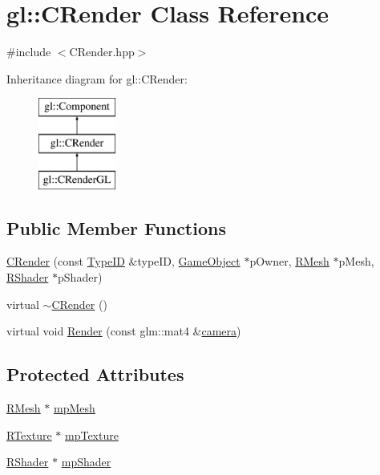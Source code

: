 \hypertarget{classgl_1_1_c_render}{\section{gl\-:\-:C\-Render Class Reference}
\label{classgl_1_1_c_render}
}


{\ttfamily \#include $<$C\-Render.\-hpp$>$}

Inheritance diagram for gl\-:\-:C\-Render\-:\begin{figure}[H]
\begin{center}
\leavevmode
\includegraphics[height=3.000000cm]{classgl_1_1_c_render}
\end{center}
\end{figure}
\subsection*{Public Member Functions}
\begin{DoxyCompactItemize}
\item 
\hyperlink{classgl_1_1_c_render_ad81c4b1eaf7060f8314b7b63fbb35f57}{C\-Render} (const \hyperlink{classgl_1_1_component_a2dae94eddffdba218f51d19dd9d66e4e}{Type\-I\-D} \&type\-I\-D, \hyperlink{classgl_1_1_game_object}{Game\-Object} $\ast$p\-Owner, \hyperlink{classgl_1_1_r_mesh}{R\-Mesh} $\ast$p\-Mesh, \hyperlink{classgl_1_1_r_shader}{R\-Shader} $\ast$p\-Shader)
\item 
virtual \hyperlink{classgl_1_1_c_render_a28594f36d8ae3136dfd35018c0ea14a6}{$\sim$\-C\-Render} ()
\item 
virtual void \hyperlink{classgl_1_1_c_render_a9cc0ab19657613e1767fa0dd5a580617}{Render} (const glm\-::mat4 \&\hyperlink{namespacegl_a5580e107f8adbdc0f887df19caebb589}{camera})
\end{DoxyCompactItemize}
\subsection*{Protected Attributes}
\begin{DoxyCompactItemize}
\item 
\hyperlink{classgl_1_1_r_mesh}{R\-Mesh} $\ast$ \hyperlink{classgl_1_1_c_render_a0dd8e2aad391023cc6ffb31fdc84a9ba}{mp\-Mesh}
\item 
\hyperlink{classgl_1_1_r_texture}{R\-Texture} $\ast$ \hyperlink{classgl_1_1_c_render_ae6e4037e82d612aae8e25885538e96f9}{mp\-Texture}
\item 
\hyperlink{classgl_1_1_r_shader}{R\-Shader} $\ast$ \hyperlink{classgl_1_1_c_render_a7114c3d03ac0e599755f9f7f5f85960d}{mp\-Shader}
\end{DoxyCompactItemize}
